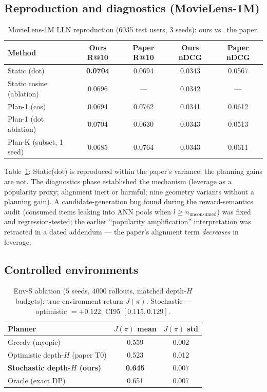 \documentclass[11pt,a4paper]{article}
\newcommand{\J}{J(\pi)}
\begin{document}
\subsection{Reproduction and diagnostics (MovieLens-1M)}
\label{sec:results-repro}

\begin{table}[t]
\centering\small
\caption{MovieLens-1M LLN reproduction (6035 test users, 3 seeds): ours vs.\ the paper.}
\label{tab:repro}
\begin{tabular}{@{}lcccc@{}}
\toprule
Method & Ours R@10 & Paper R@10 & Ours nDCG & Paper nDCG \\
\midrule
Static (dot) & \textbf{0.0704} & 0.0694 & 0.0343 & 0.0567 \\
Static cosine (ablation) & 0.0696 & --- & 0.0342 & --- \\
Plan-1 (cos) & 0.0694 & 0.0762 & 0.0341 & 0.0612 \\
Plan-1 (dot ablation) & 0.0704 & 0.0630 & 0.0343 & 0.0513 \\
Plan-K (subset, 1 seed) & 0.0685 & 0.0764 & 0.0343 & 0.0611 \\
\bottomrule
\end{tabular}
\end{table}

Table~\ref{tab:repro}: Static(dot) is reproduced within the paper's variance; the
planning gains are not. The diagnostics phase established the mechanism (leverage as a
popularity proxy; alignment inert or harmful; nine geometry variants without a planning
gain). A candidate-generation bug found during the reward-semantics audit (consumed
items leaking into ANN pools when $l \ge n_{\text{unconsumed}}$) was fixed and
regression-tested; the earlier ``popularity amplification'' interpretation was retracted
in a dated addendum --- the paper's alignment term \emph{decreases} in leverage.

\subsection{Controlled environments}

\begin{table}[t]
\centering\small
\caption{Env-S ablation ($5$ seeds, $4000$ rollouts, matched depth-$H$ budgets):
true-environment return $\J$. Stochastic $-$ optimistic $= +0.122$, CI95 $[0.115, 0.129]$.}
\label{tab:envs}
\begin{tabular}{@{}lcc@{}}
\toprule
Planner & $\J$ mean & $\J$ std \\
\midrule
Greedy (myopic) & 0.559 & 0.002 \\
Optimistic depth-$H$ (paper T0) & 0.523 & 0.012 \\
\textbf{Stochastic depth-$H$ (ours)} & \textbf{0.645} & 0.007 \\
Oracle (exact DP) & 0.651 & 0.007 \\
\bottomrule
\end{tabular}
\end{table}
\end{document}
